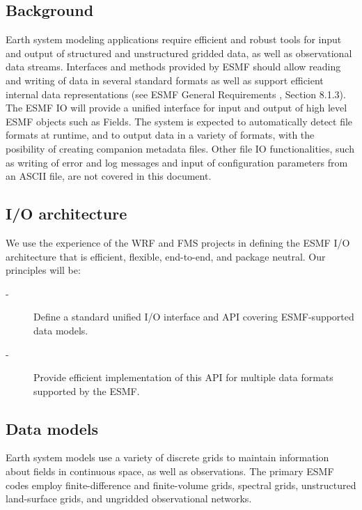 
\subsection{Background}

Earth system modeling applications require efficient and robust tools
for input and output of structured and unstructured gridded data, as
well as observational data streams.  Interfaces and methods provided
by ESMF should allow reading and writing of data in several standard
formats as well as support efficient internal data representations
(see ESMF General Requirements \cite{ESMFGenReq}, Section 8.1.3). 
The ESMF IO will provide a unified interface for input and output 
of high level ESMF objects such as Fields.  The system is expected to 
automatically detect file formats at runtime, and to output data in a variety 
of formats, with the posibility of creating companion metadata files. Other 
file IO functionalities, such as writing of error and log messages and input 
of configuration parameters from an ASCII file, are not covered in this
document. 

\subsection{I/O architecture}

We use the experience of the WRF \cite{WRF-Software} and FMS 
\cite{BalajiParallelIO2000}  projects in defining the 
ESMF I/O architecture that is efficient, flexible, end-to-end, and package 
neutral. Our principles will be:

\begin{description}
\item[-] Define a standard unified I/O interface and API covering 
         ESMF-supported data models.
\item[-] Provide efficient implementation of this API for multiple data 
         formats supported by the ESMF. 
\end{description}



\subsection{Data models}

Earth system models use a variety of discrete grids to maintain information 
about fields in continuous space, as well as observations. The primary ESMF 
codes employ finite-difference and finite-volume grids, spectral grids, 
unstructured land-surface grids, and ungridded observational networks.

